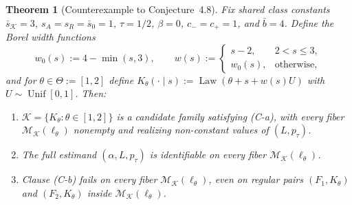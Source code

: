 \documentclass[11pt]{article}
\theoremstyle{plain}
\newtheorem{theorem}{Theorem}
\theoremstyle{definition}
\theoremstyle{remark}
\DeclareMathOperator{\Law}{Law}
\DeclareMathOperator{\Unif}{Unif}
\begin{document}
\begin{theorem}[Counterexample to Conjecture~4.8]\label{thm:counterexample}
Fix shared class constants $\bar s_{\mathcal{K}} = 3$, $s_A = s_R = \bar s_0 = 1$, $\tau = 1/2$, $\beta = 0$, $c_- = c_+ = 1$, and $\bar b = 4$. Define the Borel width functions
\[
w_0(s) := 4 - \min(s, 3), \qquad
w(s) := \begin{cases}
s - 2, & 2 < s \le 3,\\
w_0(s), & \text{otherwise},
\end{cases}
\]
and for $\theta \in \Theta := [1, 2]$ define $K_\theta(\cdot \mid s) := \Law(\theta + s + w(s) U)$ with $U \sim \Unif[0, 1]$. Then:
\begin{enumerate}[label=\textup{(\arabic*)}]
\item $\mathcal{K} = \{K_\theta : \theta \in [1, 2]\}$ is a candidate family satisfying \textup{(C-a)}, with every fiber $\mathcal{M}_{\mathcal{K}}(\ell_\theta)$ nonempty and realizing non-constant values of $(L, p_\tau)$.
\item The full estimand $(\alpha, L, p_\tau)$ is identifiable on every fiber $\mathcal{M}_{\mathcal{K}}(\ell_\theta)$.
\item Clause \textup{(C-b)} fails on every fiber $\mathcal{M}_{\mathcal{K}}(\ell_\theta)$, even on regular pairs $(F_1, K_\theta)$ and $(F_2, K_\theta)$ inside $\mathcal{M}_{\mathcal{K}}(\ell_\theta)$.
\end{enumerate}
\end{theorem}
\end{document}
